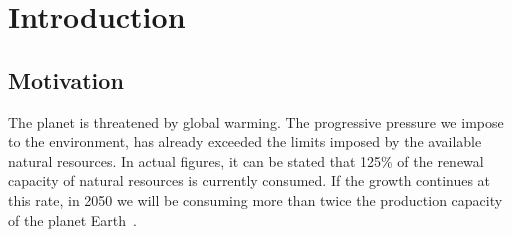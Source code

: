


\chapter{Introduction} \label{chap1:introduction}




\section{Motivation} \label{sec1:motivation}

    The planet is threatened by global warming. The progressive pressure we impose to the environment, has already exceeded the limits imposed by the available natural resources. In actual figures, it can be stated that 125\% of the renewal capacity of natural resources is currently consumed. If the growth continues at this rate, in 2050 we will be consuming more than twice the production capacity of the planet Earth~\cite{Townsend:2002:2050}. 
    
